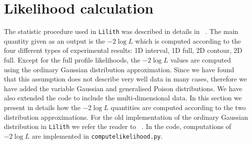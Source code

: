 \clearpage
\section{Likelihood calculation} \label{sec:likelihood}
\newcommand{\lilith}{{\tt Lilith} }
\newcommand{\logL}{{ -2\log L } }
\newcommand{\XML}{ {\tt XML}}
\newcommand{\beq}{\begin{eqnarray}} 
\newcommand{\eeq}{\end{eqnarray}} 

\newcommand{\be}{\begin{equation}} 
\newcommand{\ee}{\end{equation}} 

\newcommand{\bpmatrix}{\begin{pmatrix}}
\newcommand{\epmatrix}{\end{pmatrix}}
\newcommand{\ba}{\begin{array}}
\newcommand{\ea}{\end{array}}
\newcommand{\braket}[1]{\left(#1\right)}
\newcommand{\sbraket}[1]{\left[#1\right]}
\newcommand{\bmu}{\bm{\mu}}
\newcommand{\hbmu}{\hat{\bm{\mu}}}

The statistic procedure used in \lilith was described in details in ~\cite{Bernon:2015hsa}. 
The main quantity given as an output 
is the  $\logL$ which is computed according to the four different types of experimental results: 1D interval, 1D full,
2D contour, 2D full. Except for the full profile likelihoods, the $\logL$ values are computed using the ordinary Gaussian
distribution approximation. Since we have found that this assumption does not describe very well data in many cases, therefore
 we have added the  variable Gaussian and generalised Poison distributions. We have also extended the code to include the multi-dimensional data. In this section we present in details
how the  $\logL$ quantities are computed according to the two distribution approximations. For the old implementation of the  ordinary Gaussian distribution in \lilith
we refer the reader to ~\cite{Bernon:2015hsa}.
In the code, computations of $\logL$  are implemented in {\tt computelikelihood.py}.

